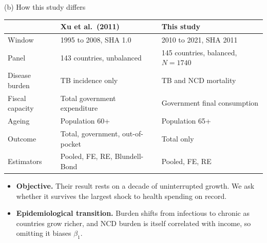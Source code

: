 \documentclass[10pt,aspectratio=169,t]{beamer}
\begin{document}
\begin{frame}{(b) How this study differs}
\vspace{0.4em}
\begin{center}
\small
\begin{tabular}{@{}l l l@{}}
\toprule
 & \textbf{Xu et al.\ (2011)} & \textbf{This study} \\
\midrule
Window          & 1995 to 2008, SHA 1.0 & \alert{2010 to 2021}, SHA 2011 \\
Panel           & 143 countries, unbalanced & 145 countries, \alert{balanced}, $N=1740$ \\
Disease burden  & TB incidence only & TB \alert{and NCD mortality} \\
Fiscal capacity & Total government expenditure & Government final consumption \\
Ageing          & Population 60+ & Population 65+ \\
Outcome         & Total, government, out-of-pocket & Total only \\
Estimators      & Pooled, FE, RE, Blundell-Bond & Pooled, FE, RE \\
\bottomrule
\end{tabular}
\end{center}

\vspace{1em}
\begin{itemize}\setlength\itemsep{0.5em}
  \item \textbf{Objective.} Their result rests on a decade of uninterrupted
        growth. We ask whether it survives the largest shock to health spending
        on record.
  \item \textbf{Epidemiological transition.} Burden shifts from infectious to
        chronic as countries grow richer, and NCD burden is itself correlated
        with income, so omitting it biases $\beta_1$.
\end{itemize}
\end{frame}

\end{document}
